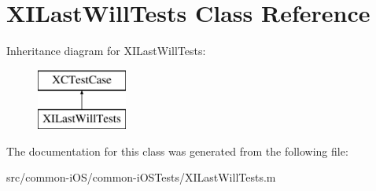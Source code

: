 \hypertarget{interface_x_i_last_will_tests}{}\section{X\+I\+Last\+Will\+Tests Class Reference}
\label{interface_x_i_last_will_tests}
Inheritance diagram for X\+I\+Last\+Will\+Tests\+:\begin{figure}[H]
\begin{center}
\leavevmode
\includegraphics[height=2.000000cm]{interface_x_i_last_will_tests}
\end{center}
\end{figure}


The documentation for this class was generated from the following file\+:\begin{DoxyCompactItemize}
\item 
src/common-\/i\+O\+S/common-\/i\+O\+S\+Tests/X\+I\+Last\+Will\+Tests.\+m\end{DoxyCompactItemize}
